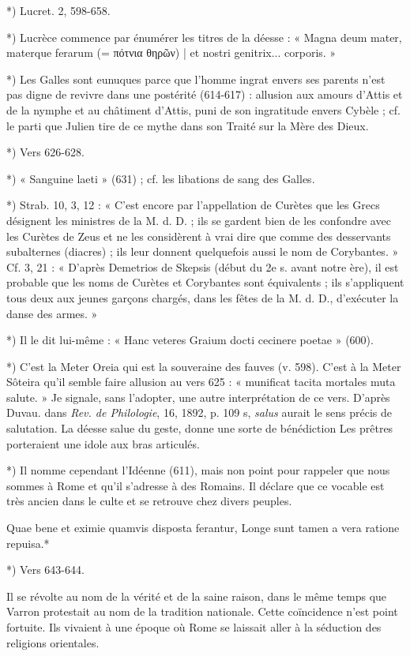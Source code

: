 \documentclass[a4paper, 11pt, oneside, polutonikogreek, french]{article}
\begin{document}
*) Lucret. 2, 598-658.

*) Lucrèce commence par énumérer les titres de la déesse : « Magna deum mater, materque ferarum (= πότνια θηρῶν) | et nostri genitrix... corporis. »

*) Les Galles sont eunuques parce que l'homme ingrat envers ses parents n'est pas digne de revivre dans une postérité (614-617) : allusion aux amours d'Attis et de la nymphe et au châtiment d'Attis, puni de son ingratitude envers Cybèle ; cf. le parti que Julien tire de ce mythe dans son Traité sur la Mère des Dieux.

*) Vers 626-628.

*) « Sanguine laeti » (631) ; cf. les libations de sang des Galles.

*) Strab. 10, 3, 12 : « C'est encore par l'appellation de Curètes que les Grecs désignent les ministres de la M. d. D. ; ils se gardent bien de les confondre avec les Curètes de Zeus et ne les considèrent à vrai dire que comme des desservants subalternes (diacres) ; ils leur donnent quelquefois aussi le nom de Corybantes. » Cf. 3, 21 : « D'après Demetrios de Skepsis (début du 2e s. avant notre ère), il est probable que les noms de Curètes et Corybantes sont équivalents ; ils s'appliquent tous deux aux jeunes garçons chargés, dans les fêtes de la M. d. D., d'exécuter la danse des armes. »

*) Il le dit lui-même : « Hanc veteres Graium docti cecinere poetae » (600).

*) C'est la Meter Oreia qui est la souveraine des fauves (v. 598). C'est à la Meter Sôteira qu'il semble faire allusion au vers 625 : « munificat tacita mortales muta salute. » Je signale, sans l'adopter, une autre interprétation de ce vers. D'après Duvau. dans \emph{Rev. de Philologie}, 16, 1892, p. 109 s, \emph{salus} aurait le sens précis de salutation. La déesse salue du geste, donne une sorte de bénédiction Les prêtres porteraient une idole aux bras articulés.

*) Il nomme cependant l'Idéenne (611), mais non point pour rappeler que nous sommes à Rome et qu'il s'adresse à des Romains. Il déclare que ce vocable est très ancien dans le culte et se retrouve chez divers peuples.

Quae bene et eximie quamvis disposta ferantur,  
Longe sunt tamen a vera ratione repuisa.*

*) Vers 643-644.

Il se révolte au nom de la vérité et de la saine raison, dans le même temps que Varron protestait au nom de la tradition nationale. Cette coïncidence n'est point fortuite. Ils vivaient à une époque où Rome se laissait aller à la séduction des religions orientales.
\clearpage
\end{document}
